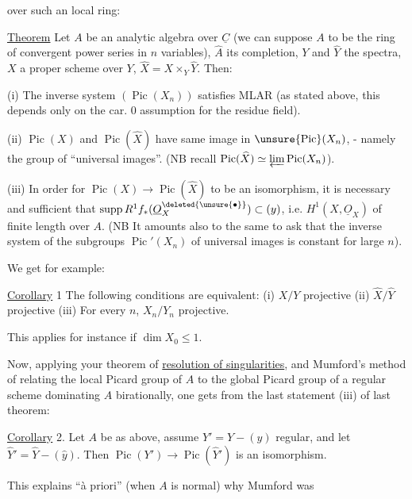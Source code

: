 
over such an local ring:

\uline{Theorem} Let $A$ be an analytic algebra over $\underline{C}$ (we can suppose $A$ to be the ring of convergent power series\deleted{\unsure{)}} in $n$ variables), $\widehat{A}$ its completion, $Y$ and $\widehat{Y}$ the spectra, $X$ a proper scheme over $Y$, $\widehat{X}=X\times_Y\widehat{Y}$. Then:

(i) The inverse system $(\operatorname{Pic}(X_n))$ satisfies MLAR (as stated above, this depends only on the car. 0 assumption for the residue field).

(ii) $\operatorname{Pic}(X)$ and $\operatorname{Pic}(\widehat{X})$ have same image in $\unsure{\operatorname{Pic}}(X_n)$, - namely the group of ``universal images''. (NB recall $\operatorname{Pic}(\widehat{X})\simeq\varprojlim\operatorname{Pic}(X_n)$).

(iii) In order for $\operatorname{Pic}(X)\longrightarrow\operatorname{Pic}(\widehat{X})$ to be an isomorphism, it is necessary and sufficient that $\operatorname{supp}R^1f_*(\underline{O}_X^{\deleted{\unsure{\bullet}}})\subset(y)$, i.e. $H^1(X,\underline{O}_X)$ of finite length over $A$. (NB It amounts also to the same to  ask that the inverse system of the subgroups $\operatorname{Pic}'(X_n)$ of universal images is constant for large $n$).

We get for example:

\uline{Corollary} 1 The following conditions are equivalent: (i) $X/Y$ projective (ii) $\widehat{X}/\widehat{Y}$ projective (iii) For every $n$, $X_n/Y_n$ projective.

This applies for instance if $\dim X_0\leq1$.

Now, applying your theorem of \uline{resolution of singularities}, and Mumford's method of relating the local Picard group of $A$ to the global Picard group of a regular scheme dominating $A$ birationally, one gets from the last statement  (iii) of last theorem:

\uline{Corollary} 2. Let $A$ be as above, assume  $Y'=Y-(y)$ regular, and let $\widehat{Y}'=\widehat{Y}-(\widehat{y})$. Then $\operatorname{Pic}(Y')\longrightarrow\operatorname{Pic}(\widehat{Y}')$ is an isomorphism.

This explains ``à priori'' (when $A$ is normal) why Mumford was

